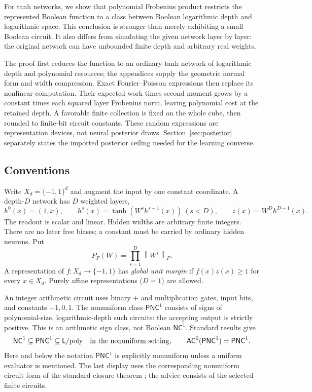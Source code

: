 \documentclass[11pt]{article}
\theoremstyle{remark}\newtheorem{remark}[theorem]{Remark}
\newcommand{\norm}[1]{\left\lVert#1\right\rVert}
\newcommand{\PNC}{\mathsf{PNC}}
\newcommand{\NC}{\mathsf{NC}}
\newcommand{\AC}{\mathsf{AC}}
\newcommand{\Lpoly}{\mathsf L/\mathrm{poly}}
\newcommand{\PF}{P_F}
\begin{document}
For tanh networks, we show that polynomial Frobenius product restricts
the represented Boolean function to a class between Boolean logarithmic
depth and logarithmic space. This conclusion is stronger than merely
exhibiting a small Boolean circuit. It also differs from simulating the
given network layer by layer: the original network can have unbounded
finite depth and arbitrary real weights.

The proof first reduces the function to an ordinary-tanh network of
logarithmic depth and polynomial resources; the appendices supply the
geometric normal form and width compression. Exact Fourier--Poisson
expressions then replace its nonlinear computation. Their expected work
times second moment grows by a constant times each squared layer
Frobenius norm, leaving polynomial cost at the retained depth. A favorable
finite collection is fixed on the whole cube, then rounded to finite-bit
circuit constants. These random expressions are representation devices,
not neural posterior draws. Section~\ref{sec:posterior} separately states
the imported posterior ceiling needed for the learning converse.

\subsection{Conventions}

Write $X_d=\{-1,1\}^d$ and augment the input by one constant coordinate.
A depth-$D$ network has $D$ weighted layers,
\[
 h^0(x)=(1,x),\qquad h^s(x)=\tanh(W^s h^{s-1}(x))\ (s<D),
 \qquad z(x)=W^D h^{D-1}(x).
\]
The readout is scalar and linear. Hidden widths are arbitrary finite
integers. There are no later free biases; a constant must be carried by
ordinary hidden neurons. Put
\[
 \PF(W)=\prod_{s=1}^D\norm{W^s}_F.
\]
A representation of $f:X_d\to\{-1,1\}$ has \emph{global unit margin}
if $f(x)z(x)\ge1$ for every $x\in X_d$. Purely affine representations
($D=1$) are allowed.

An integer arithmetic circuit uses binary $+$ and multiplication gates,
input bits, and constants $-1,0,1$. The nonuniform class $\PNC^1$
consists of signs of polynomial-size, logarithmic-depth such circuits:
the accepting output is strictly positive. This is an arithmetic sign
class, not Boolean $\NC^1$. Standard results give
\[
 \NC^1\subseteq\PNC^1\subseteq\Lpoly
 \quad\hbox{in the nonuniform setting},
 \qquad \AC^0(\PNC^1)=\PNC^1.
\]
Here and below the notation $\PNC^1$ is explicitly nonuniform unless a
uniform evaluator is mentioned. The last display uses the corresponding
nonuniform circuit form of the standard closure theorem
\cite{datta}; the advice consists of the selected finite circuits.
\end{document}
